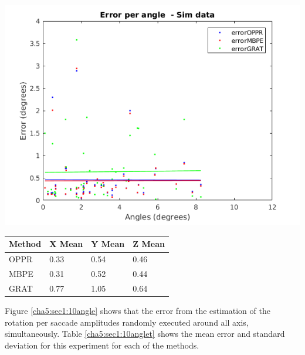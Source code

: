 \begin{minipage}{0.33\textwidth}
	\centering
	\includegraphics[width=\textwidth]{images/sim/10anglez.png}
	\label{cha5:sec1:10anglez}
\end{minipage}
\begin{table}
	\centering
	\begin{tabular}{| l | l | l | l |}
		\hline
		Method & X Mean & Y Mean & Z Mean \\
		\hline
		OPPR &  0.33 \degree & 0.54 \degree & 0.46 \degree \\
		\hline
		MBPE &  0.31 \degree & 0.52 \degree & 0.44 \degree\\
		\hline
		GRAT &  0.77 \degree & 1.05 \degree & 0.64 \degree\\ 
		\hline
	\end{tabular}
	\label{cha5:sec1:10angleaxist}
\end{table}		

Figure \ref{cha5:sec1:10angle} shows that the error from the estimation of the rotation per saccade amplitudes randomly executed around all axis, simultaneously. Table \ref{cha5:sec1:10anglet} shows the mean error and standard deviation for this experiment for each of the methods.\\

